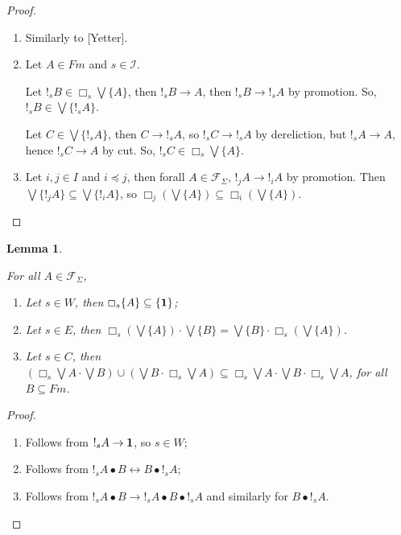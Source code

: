 \documentclass[a4paper]{article}
\theoremstyle{defin}
\theoremstyle{theorem}
\theoremstyle{prop}
\theoremstyle{lemma}
\newtheorem{lemma}{Lemma}
\theoremstyle{ex}
\theoremstyle{col}
\begin{document}
\begin{proof}
$ $

\begin{enumerate}
\item Similarly to [Yetter].
\item Let $A \in Fm$ and $s \in \mathcal{I}$.

Let $!_s B \in \Box_s \bigvee \{ A \}$, then $!_s B \rightarrow A$, then $!_s B \rightarrow !_s A$
by promotion. So, $!_s B \in \bigvee \{ !_s A \}$.

Let $C \in \bigvee \{ !_s A \}$, then $C \rightarrow !_s A$, so $!_s C \rightarrow !_s A$ by dereliction, but $!_s A \rightarrow A$, hence $!_s C \rightarrow A$ by cut. So, $!_s C \in \Box_s \bigvee \{ A \}$.
\item   Let $i, j \in I$ and $i \preceq j$, then forall $A \in \mathcal{F}_{\Sigma}$, $!_j A \rightarrow !_i A$ by promotion.
  Then $\bigvee \{ !_j A \} \subseteq \bigvee \{ !_i A \}$, so $\Box_j (\bigvee \{ A \}) \subseteq \Box_i (\bigvee \{ A \})$.
\end{enumerate}
\end{proof}

\begin{lemma}
$ $

For all $A \in \mathcal{F}_{\Sigma}$,
  \begin{enumerate}
    \item Let $s \in W$, then $\Box_s \{ A \} \subseteq \{ {\bf 1} \}$;
    \item Let $s \in E$, then $\Box_s (\bigvee \{ A \}) \cdot \bigvee \{ B \} = \bigvee \{ B\} \cdot \Box_s (\bigvee \{ A \})$.
    \item Let $s \in C$, then $(\Box_s \bigvee A \cdot \bigvee B) \cup (\bigvee B \cdot \Box_s \bigvee A) \subseteq \Box_s \bigvee A \cdot \bigvee B \cdot \Box_s \bigvee A$, for all $B \subseteq Fm$.
  \end{enumerate}
\end{lemma}

\begin{proof}
$ $

\begin{enumerate}
  \item Follows from $!_s A \rightarrow {\bf 1}$, so $s \in W$;
  \item Follows from $!_s A \bullet B \leftrightarrow B \bullet !_s A$;
  \item Follows from $!_s A \bullet B \rightarrow !_s A \bullet B \bullet !_s A$ and similarly for $B \bullet !_s A$.
\end{enumerate}
\end{proof}
\end{document}
